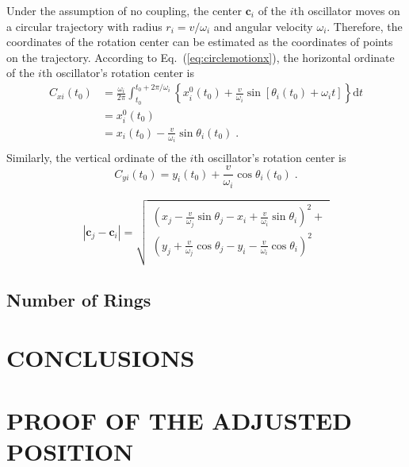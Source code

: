 \documentclass[%
 aip,
 amsmath,amssymb,
 reprint,%
]{revtex4-1}
\begin{document}
Under the assumption of no coupling, the center $\mathbf{c}_i$ of the $i$th oscillator moves on a circular trajectory with radius $r_i=v/\omega_i$ and angular velocity $\omega_i$. 
Therefore, the coordinates of the rotation center can be estimated as the coordinates of points on the trajectory.
According to Eq.~(\ref{eq:circlemotionx}), the horizontal ordinate of the $i$th oscillator's rotation center is
\begin{equation}
    \begin{aligned}
        C_{xi}\left( t_0 \right) &=\frac{\omega _i}{2\pi}\int_{t_0}^{t_0+2\pi /\omega _i}{\left\{ x_{i}^{0}\left( t_0 \right) +\frac{v}{\omega _i}\sin \left[ \theta _i\left( t_0 \right) +\omega _it \right] \right\} \mathrm{d}t}\\
        &=x_{i}^{0}\left( t_0 \right)\\
        &=x_i\left( t_0 \right) -\frac{v}{\omega _i}\sin \theta _i\left( t_0 \right)\;.\\
    \end{aligned}
\end{equation}
Similarly, the vertical ordinate of the $i$th oscillator's rotation center is
\begin{equation}
    C_{yi}\left( t_0 \right) =y_i\left( t_0 \right) +\frac{v}{\omega _i}\cos \theta _i\left( t_0 \right)\;.
\end{equation}

\begin{equation}
    \left| \mathbf{c}_j-\mathbf{c}_i \right|=\sqrt{\begin{array}{l}
        \left( x_j-\frac{v}{\omega _j}\sin \theta _j-x_i+\frac{v}{\omega _i}\sin \theta _i \right) ^2+\\
        \left( y_j+\frac{v}{\omega _j}\cos \theta _j-y_i-\frac{v}{\omega _i}\cos \theta _i \right) ^2\\
    \end{array}}
\end{equation}

\subsection{Number of Rings \label{sec:numRings}}

\section{CONCLUSIONS}

\appendix

\section{\label{sec:adj_pos} PROOF OF THE ADJUSTED POSITION}
\end{document}

